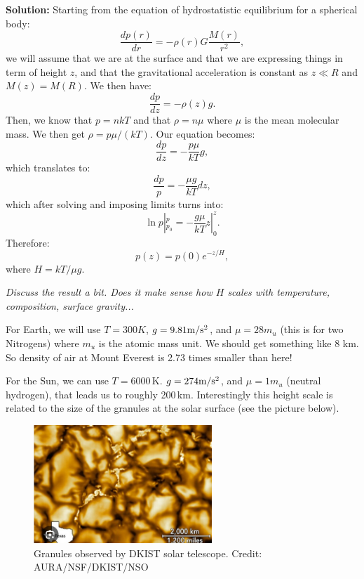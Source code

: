 \documentclass[12pt]{article}
\begin{document}
{\bf Solution:} Starting from the equation of hydrostatistic
equilibrium for a spherical body:
\begin{equation}
\frac{dp(r)}{dr} = - \rho(r) G\frac{M(r)}{r^2},
\end{equation}
we will assume that we are at the surface and that we are expressing
things in term of height $z$, and that the gravitational acceleration
is constant as $z\ll R$ and $M(z) = M(R)$. We then have:
\begin{equation}
\frac{dp}{dz} = - \rho(z) g. 
\end{equation}
Then, we know that $p = nkT$ and that $\rho = n \mu$ where $\mu$ is
the mean molecular mass. We then get $\rho = p \mu/ (kT)$. Our
equation becomes:
\begin{equation}
\frac{dp}{dz} = - \frac{p \mu}{kT} g,
\end{equation}
which translates to:
\begin{equation}
\frac{dp}{p} = - \frac{\mu g}{kT} dz,
\end{equation}
which after solving and imposing limits turns into: 
\begin{equation}
\ln p |_{p_0}^p = - \frac{g \mu}{kT} z|_0^z.
\end{equation}
Therefore:
\begin{equation}
p(z) = p(0) e^{-z/H},
\end{equation}
where $H = kT / \mu g$.

\emph{Discuss the result a bit. Does it make sense how $H$ scales with
temperature, composition, surface gravity...}

For Earth, we will use $T = 300 K$, $g=9.81 {\rm m/s^2}$, and $\mu=28
m_u$ (this is for two Nitrogens) where $m_u$ is the atomic mass
unit. We should get something like 8 km. So density of air at Mount
Everest is 2.73 times smaller than here!

For the Sun, we can use $T = 6000$\,K. $g = 274 {\rm m/s^2}$, and
$\mu=1 m_u$ (neutral hydrogen), that leads us to roughly
200\,km. Interestingly this height scale is related to the size of the
granules at the solar surface (see the picture below).

\begin{figure}
\includegraphics[width=0.6\textwidth]{granulation.jpg}
\caption{Granules observed by DKIST solar telescope. Credit: AURA/NSF/DKIST/NSO}
\end{figure}
\end{document}
